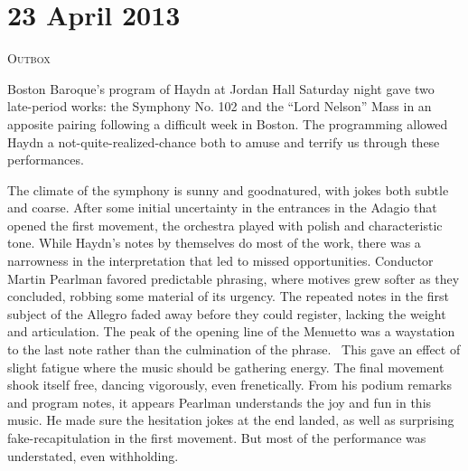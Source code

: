 \chapter{23 April 2013}

\textsc{Outbox}

Boston Baroque’s program of Haydn at Jordan Hall Saturday night gave two late-period works: the Symphony No. 102 and the “Lord Nelson” Mass in an apposite pairing following a difficult week in Boston. The programming allowed Haydn a not-quite-realized-chance both to amuse and terrify us through these performances.

The climate of the symphony is sunny and goodnatured, with jokes both subtle and coarse. After some initial uncertainty in the entrances in the Adagio that opened the first movement, the orchestra played with polish and characteristic tone. While Haydn’s notes by themselves do most of the work, there was a narrowness in the interpretation that led to missed opportunities. Conductor Martin Pearlman favored predictable phrasing, where motives grew softer as they concluded, robbing some material of its urgency. The repeated notes in the first subject of the Allegro faded away before they could register, lacking the weight and articulation. The peak of the opening line of the Menuetto was a waystation to the last note rather than the culmination of the phrase.  This gave an effect of slight fatigue where the music should be gathering energy. The final movement shook itself free, dancing vigorously, even frenetically. From his podium remarks and program notes, it appears Pearlman understands the joy and fun in this music. He made sure the hesitation jokes at the end landed, as well as surprising fake-recapitulation in the first movement. But most of the performance was understated, even withholding.

